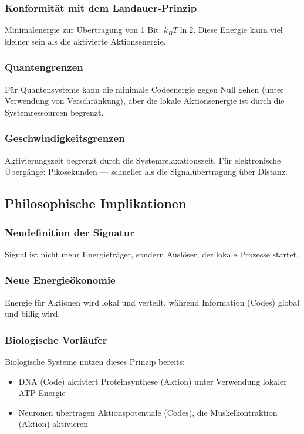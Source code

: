 \documentclass[11pt,a4paper]{article}
\begin{document}
	\subsubsection{Konformität mit dem Landauer-Prinzip}
	Minimalenergie zur Übertragung von 1 Bit: $k_B T \ln 2$. Diese Energie kann viel kleiner sein als die aktivierte Aktionsenergie.
	
	\subsubsection{Quantengrenzen}
	Für Quantensysteme kann die minimale Codeenergie gegen Null gehen (unter Verwendung von Verschränkung), aber die lokale Aktionsenergie ist durch die Systemressourcen begrenzt.
	
	\subsubsection{Geschwindigkeitsgrenzen}
	Aktivierungszeit begrenzt durch die Systemrelaxationszeit. Für elektronische Übergänge: Pikosekunden — schneller als die Signalübertragung über Distanz.
	
	\subsection{Philosophische Implikationen}
	
	\subsubsection{Neudefinition der Signatur}
	Signal ist nicht mehr Energieträger, sondern Auslöser, der lokale Prozesse startet.
	
	\subsubsection{Neue Energieökonomie}
	Energie für Aktionen wird lokal und verteilt, während Information (Codes) global und billig wird.
	
	\subsubsection{Biologische Vorläufer}
	Biologische Systeme nutzen dieses Prinzip bereits:
	\begin{itemize}
		\item DNA (Code) aktiviert Proteinsynthese (Aktion) unter Verwendung lokaler ATP-Energie
		\item Neuronen übertragen Aktionspotentiale (Codes), die Muskelkontraktion (Aktion) aktivieren
	\end{itemize}
	
\end{document}
